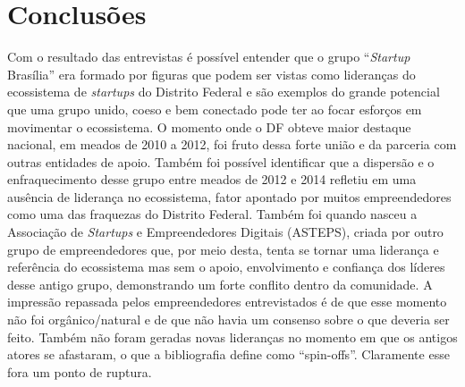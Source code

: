 \chapter[Conclusões]{Conclusões}
\label{cap-conclusoes}

Com o resultado das entrevistas é possível entender que o grupo ``\textit{Startup} Brasília'' era formado por figuras que podem ser vistas como lideranças do ecossistema de \textit{startups} do Distrito Federal e são exemplos do grande potencial que uma grupo unido, coeso e bem conectado pode ter ao focar esforços em movimentar o ecossistema. O momento onde o DF obteve maior destaque nacional, em meados de 2010 a 2012, foi fruto dessa forte união e da parceria com outras entidades de apoio. Também foi possível identificar que a dispersão e o enfraquecimento desse grupo entre meados de 2012 e 2014 refletiu em uma ausência de liderança no ecossistema, fator apontado por muitos empreendedores como uma das fraquezas do Distrito Federal. Também foi quando nasceu a Associação de \textit{Startups} e Empreendedores Digitais (ASTEPS), criada por outro grupo de empreendedores que, por meio desta, tenta se tornar uma liderança e referência do ecossistema mas sem o apoio, envolvimento e confiança dos líderes desse antigo grupo, demonstrando um forte conflito dentro da comunidade. A impressão repassada pelos empreendedores entrevistados é de que esse momento não foi orgânico/natural e de que não havia um consenso sobre o que deveria ser feito. Também não foram geradas novas lideranças no momento em que os antigos atores se afastaram, o que a bibliografia define como ``spin-offs''. Claramente esse fora um ponto de ruptura.


